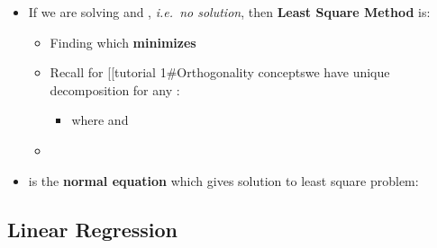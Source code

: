 \begin{itemize}

  \item
        If we are solving  and
        , \emph{i.e.~no solution},
        then \textbf{Least Square Method} is:

        \begin{itemize}

          \item
                Finding  which \textbf{minimizes}
          \item
                Recall for  {[}{[}tutorial
                1\#Orthogonality concepts\textbar we have unique decomposition for
                any \iMbox{\mathbf{b} \in \mathbb{R}^{m}}{]}{]}:

                \begin{itemize}

                  \item
                        where  and
                \end{itemize}
          \item
        \end{itemize}
  \item
         is the \textbf{normal
          equation} which gives solution to least square problem:
\end{itemize}

\subsection*{Linear Regression}

